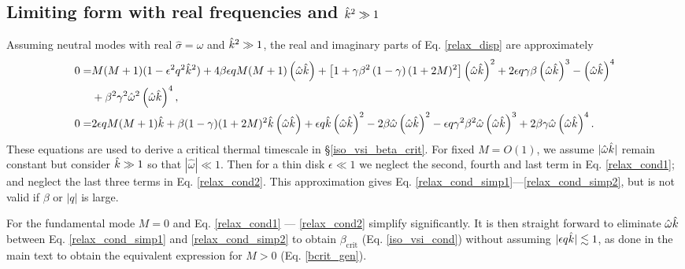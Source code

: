 \subsection{Limiting form with real frequencies and $\hat{k}^2\gg 1$}\label{disp_neut_limit}
Assuming neutral modes with real $\hat{\sigma}=\hat{\omega}$ and $\hat{k}^2\gg 1$, the real and imaginary parts of
Eq. \ref{relax_disp} are approximately 
\begin{align}
  0 =&M(M+1)(1-\epsilon^2 q^2 \hat{k}^2) + 4\beta\epsilon q M(M+1)\left(\hat{\omega}\hat{k}\right) 
 +\left[1 +
    \gamma\beta^2\left(1-\gamma\right)(1+2M)^2\right]\left(\hat{\omega}\hat{k}\right)^2
 + 2\epsilon q \gamma\beta \left(\hat{\omega}\hat{k}\right)^3 -  \left(\hat{\omega}\hat{k}\right)^4\notag \\
  &+ \beta^2\gamma^2\hat{\omega}^2
  \left(\hat{\omega}\hat{k}\right)^4,\label{relax_cond1} \\
   0=& 2\epsilon q M (M+1)\hat{k} +
   \beta(1-\gamma)(1+2M)^2\hat{k}\left(\hat{\omega}\hat{k}\right) 
   + \epsilon q \hat{k} \left(\hat{\omega}\hat{k}\right)^2 -
   2\beta\hat{\omega}\left(\hat{\omega}\hat{k}\right)^2
   - \epsilon q
   \gamma^2\beta^2\hat{\omega}\left(\hat{\omega}\hat{k}\right)^3 
   +
   2\beta\gamma\hat{\omega}\left(\hat{\omega}\hat{k}\right)^4 \label{relax_cond2}. 
\end{align}
These equations are used to derive a critical thermal timescale in
\S\ref{iso_vsi_beta_crit}. For fixed $M=O(1)$,  we assume
$|\hat{\omega}\hat{k}|$ remain constant but consider $\hat{k}\gg 1$ so
that $|\hat{\omega}|\ll 1$.  Then for a thin disk $\epsilon \ll 1$
we neglect the second, fourth and last term in Eq. \ref{relax_cond1};
and neglect the last three terms in Eq. \ref{relax_cond2}. This
approximation gives Eq. \ref{relax_cond_simp1}---\ref{relax_cond_simp2},
but is not valid if $\beta$ or $|q|$ is large. 

For the fundamental mode $M=0$ and Eq. \ref{relax_cond1} ---
\ref{relax_cond2} simplify significantly. It is then straight
forward to eliminate $\hat{\omega}\hat{k}$ between 
Eq. \ref{relax_cond_simp1} and \ref{relax_cond_simp2} to obtain
$\beta_\mathrm{crit}$ (Eq. \ref{iso_vsi_cond}) without
assuming $|\epsilon q \hat{k}|\lesssim 1$, as done in the main text to obtain the
equivalent expression for $M>0$ (Eq. \ref{bcrit_gen}).






